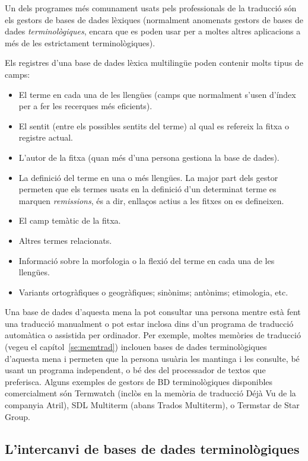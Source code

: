 Un dels programes més comunament usats pels professionals de la
traducció són els gestors de bases de dades lèxiques (normalment
anomenats gestors de bases de dades \emph{terminològiques}, encara que
es poden usar per a moltes altres aplicacions a més de les
estrictament terminològiques). 

Els registres d'una base de dades lèxica multilingüe poden contenir
molts tipus de camps:
\begin{itemize}
\item El terme en cada una de les llengües (camps que normalment s'usen
  d'índex per a fer les recerques més eficients).
\item El sentit (entre els possibles sentits del terme) al qual es
  refereix la fitxa o registre actual.
\item L'autor de la fitxa (quan més d'una persona gestiona la base de
  dades).
\item La definició del terme en una o més llengües. La major part dels
  gestor permeten que els termes usats en la definició d'un determinat
  terme es marquen \emph{remissions}, és a dir, enllaços actius a les
  fitxes on es defineixen. 
\item El camp temàtic de la fitxa.
\item Altres termes relacionats.
\item Informació sobre la morfologia o la flexió del terme en cada una
  de les llengües.
\item 
  
    Variants ortogràfiques o geogràfiques; sinònims; antònims;
    etimologia, etc. 
  
\end{itemize}

Una base de dades d'aquesta mena la pot consultar una persona mentre
està fent una traducció manualment o pot estar inclosa dins d'un
programa de traducció automàtica o assistida per ordinador. Per
exemple, moltes memòries de traducció (vegeu el
capítol~\ref{se:memtrad}) inclouen bases de dades terminològiques
d'aquesta mena i permeten que la persona usuària les mantinga i les
consulte, bé usant un programa independent, o bé des del processador
de textos que preferisca.
  Alguns exemples de gestors  de BD terminològiques disponibles comercialment
  són Termwatch (inclòs en la memòria de traducció Déjà Vu de la
  companyia Atril), SDL Multiterm (abans Trados Multiterm), o Termstar de 
  Star Group.

\subsection{L'intercanvi de bases de dades terminològiques}

